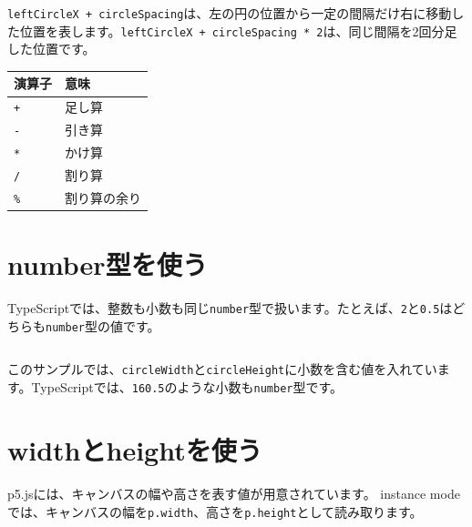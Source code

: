 \begin{listing}[htbp]
\inputminted{ts}{typescript-p5/listings/chapter04/calculated-position.ts}
\caption{変数と計算式で円を並べる（\texttt{chapter04/calculated-position.ts}）}
\label{lst:chapter04-calculated-position}
\end{listing}

\texttt{leftCircleX + circleSpacing}は、左の円の位置から一定の間隔だけ右に移動した位置を表します。\texttt{leftCircleX + circleSpacing * 2}は、同じ間隔を2回分足した位置です。

\begin{center}
\begin{tabular}{ll}
\toprule
演算子 & 意味 \\
\midrule
\texttt{+} & 足し算 \\
\texttt{-} & 引き算 \\
\texttt{*} & かけ算 \\
\texttt{/} & 割り算 \\
\texttt{\%} & 割り算の余り \\
\bottomrule
\end{tabular}
\end{center}

\section{number型を使う}

TypeScriptでは、整数も小数も同じ\texttt{number}型で扱います。たとえば、\texttt{2}と\texttt{0.5}はどちらも\texttt{number}型の値です。

\begin{listing}[htbp]
\inputminted{ts}{typescript-p5/listings/chapter04/number-variables.ts}
\caption{小数を含むnumber型の値を使う（\texttt{chapter04/number-variables.ts}）}
\label{lst:chapter04-number-variables}
\end{listing}

このサンプルでは、\texttt{circleWidth}と\texttt{circleHeight}に小数を含む値を入れています。TypeScriptでは、\texttt{160.5}のような小数も\texttt{number}型です。

\section{widthとheightを使う}

p5.jsには、キャンバスの幅や高さを表す値が用意されています。
instance modeでは、キャンバスの幅を\texttt{p.width}、高さを\texttt{p.height}として読み取ります。

